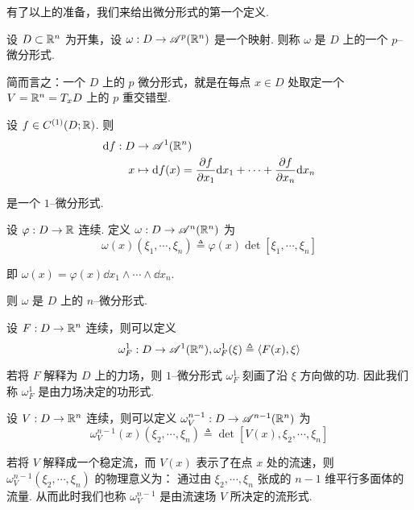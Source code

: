 
有了以上的准备，我们来给出微分形式的第一个定义.

\begin{definition}
    设 $D\subset\mathbb{R}^n$ 为开集，设 $\omega:D\to\mathscr{A}^p(\mathbb{R}^n)$ 是一个映射. 则称 $\omega$ 是 $D$ 上的一个 $p$--微分形式.
\end{definition}

简而言之：一个 $D$ 上的 $p$ 微分形式，就是在每点 $x\in D$ 处取定一个 $V=\mathbb{R}^n=T_xD$ 上的 $p$ 重交错型.

\setcounter{example}{0}
\begin{example}
    设 $f\in C^{(1)}(D;\mathbb{R})$. 则
$$
\begin{aligned}
    \mathrm{d} f:D&\to\mathscr{A}^1(\mathbb{R}^n)\\
    x&\mapsto \mathrm{d} f(x)=\frac{\partial{f}}{\partial{x_1}}\mathrm{d} x_1+\cdots+\frac{\partial{f}}{\partial{x_n}}\mathrm{d} x_n
\end{aligned}
$$

    是一个 $1$--微分形式.
\end{example}

\begin{example}
    设 $\varphi:D\to\mathbb{R}$ 连续. 定义 $\omega:D\to\mathscr{A}^n(\mathbb{R}^n)$ 为
$$
\omega(x)(\xi_1,\cdots,\xi_n)\triangleq\varphi(x)\det[\xi_1,\cdots,\xi_n]
$$

    即 $\omega(x)=\varphi(x)\dd x_1\wedge\cdots\wedge\dd x_n$.

    则 $\omega$ 是 $D$ 上的 $n$--微分形式.
\end{example}

\begin{example}
    设 $F:D\to\mathbb{R}^n$ 连续，则可以定义
$$
\omega_F^1:D\to\mathscr{A}^1(\mathbb{R}^n),\omega_F^1(\xi)\triangleq\left\langle{F(x),\xi}\right\rangle
$$

    若将 $F$ 解释为 $D$ 上的力场，则 $1$--微分形式 $\omega_F^1$ 刻画了沿 $\xi$ 方向做的功. 因此我们称 $\omega_F^1$ 是由力场决定的功形式.
\end{example}


\begin{example}
    设 $V:D\to\mathbb{R}^n$ 连续，则可以定义 $\omega_V^{n-1}:D\to\mathscr{A}^{n-1}(\mathbb{R}^n)$ 为
$$
\omega_V^{n-1}(x)(\xi_2,\cdots,\xi_n)\triangleq\det[V(x),\xi_2,\cdots,\xi_n]
$$

    若将 $V$ 解释成一个稳定流，而 $V(x)$ 表示了在点 $x$ 处的流速，则 $\omega_V^{n-1}(\xi_2,\cdots,\xi_n)$ 的物理意义为：
    通过由 $\xi_2,\cdots,\xi_n$ 张成的 $n-1$ 维平行多面体的流量.
    从而此时我们也称 $\omega_V^{n-1}$ 是由流速场 $V$ 所决定的流形式.
\end{example}

